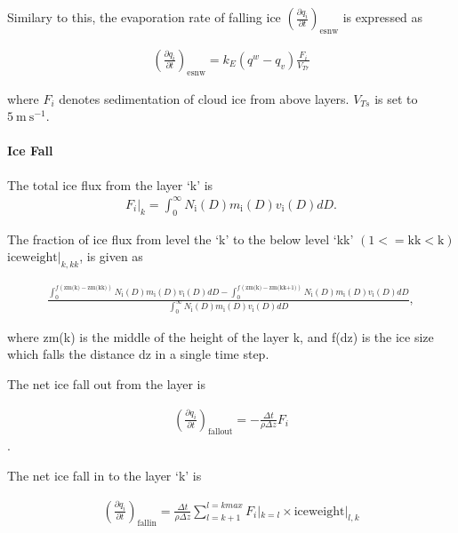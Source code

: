 Similary to this, the evaporation rate of falling ice \(\left(\frac{\partial q_i}{\partial t}\right)_{\text {esnw}}\) is expressed as

\begin{eqnarray}
\left(\frac{\partial q_i}{\partial t}\right)_{\text {esnw}}
=k_{E}\left(q^{w}-q_v\right) \frac{F_i}{V_{Tr}}
\end{eqnarray}

where \(F_i\) denotes sedimentation of cloud ice from above layers. \(V_{Ts}\) is set to \(5\mathrm{~m} \mathrm{~s}^{-1}\).

\hypertarget{ice-fall}{%
\paragraph{Ice Fall}\label{ice-fall}}

The total ice flux from the layer `k' is \begin{eqnarray}
F_i|_k = \int^\infty_0 N_{\mathrm{i}}(D) m_{\mathrm{i}}(D) v_{\text {i}}(D)dD.
\end{eqnarray}

The fraction of ice flux from level the `k' to the below level `kk' \((1<=\text{kk}<\text{k})\) \(\text{iceweight}|_{k,kk}\), is given as

\begin{eqnarray}
\frac{\int^{f(\text{zm(k)}-\text{zm(kk)})}_0 N_{\mathrm{i}}(D) m_{\mathrm{i}}(D) v_{\text {i}}(D)dD-
\int^{f(\text{zm(k)}-\text{zm(kk+1)})}_0 N_{\mathrm{i}}(D) m_{\mathrm{i}}(D) v_{\text {i}}(D)dD}
{\int^\infty_0 N_{\mathrm{i}}(D) m_{\mathrm{i}}(D) v_{\text {i}}(D)dD},
\end{eqnarray}

where zm(k) is the middle of the height of the layer k, and f(dz) is the ice size which falls the distance dz in a single time step.

The net ice fall out from the layer is

\begin{eqnarray}
\left(\frac{\partial q_i}{\partial t}\right)_{\text {fallout}}
=-\frac{\Delta t}{\rho \Delta z}F_i
\end{eqnarray}.

The net ice fall in to the layer `k' is

\begin{eqnarray}
\left(\frac{\partial q_i}{\partial t}\right)_{\text {fallin}}
=\frac{\Delta t}{\rho \Delta z} \sum^{l=kmax}_{l=k+1}F_i|_{k=l} \times \text{iceweight}|_{l,k}
\end{eqnarray}

